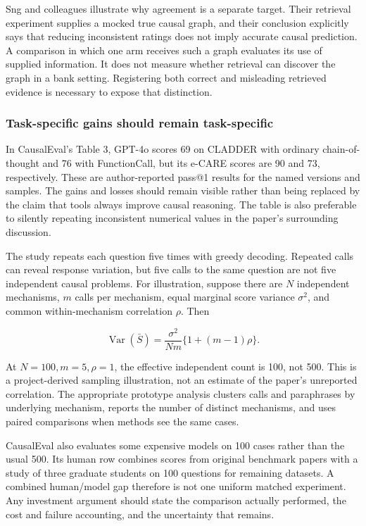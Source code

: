 Sng and colleagues illustrate why agreement is a separate target. Their
retrieval experiment supplies a mocked true causal graph, and their
conclusion explicitly says that reducing inconsistent ratings does not
imply accurate causal prediction. A comparison in which one arm receives
such a graph evaluates its use of supplied information. It does not
measure whether retrieval can discover the graph in a bank setting.
Registering both correct and misleading retrieved evidence is necessary
to expose that distinction. \cite{exec13_hallucination}

\hypertarget{task-specific-gains-should-remain-task-specific}{%
\subsubsection{Task-specific gains should remain
task-specific}\label{task-specific-gains-should-remain-task-specific}}

In CausalEval's Table 3, GPT-4o scores 69 on CLADDER with ordinary
chain-of-thought and 76 with FunctionCall, but its e-CARE scores are 90
and 73, respectively. These are author-reported pass@1 results for the
named versions and samples. The gains and losses should remain visible
rather than being replaced by the claim that tools always improve causal
reasoning. The table is also preferable to silently repeating
inconsistent numerical values in the paper's surrounding discussion.
\cite{exec13_census_causaleval}

The study repeats each question five times with greedy decoding.
Repeated calls can reveal response variation, but five calls to the same
question are not five independent causal problems. For illustration,
suppose there are \(N\) independent mechanisms, \(m\) calls per
mechanism, equal marginal score variance \(\sigma^2\), and common
within-mechanism correlation \(\rho\). Then

\[
 \operatorname{Var}(\bar S)
 =\frac{\sigma^2}{Nm}\{1+(m-1)\rho\}.
\]

At \(N=100,m=5,\rho=1\), the effective independent count is 100, not
500. This is a project-derived sampling illustration, not an estimate of
the paper's unreported correlation. The appropriate prototype analysis
clusters calls and paraphrases by underlying mechanism, reports the
number of distinct mechanisms, and uses paired comparisons when methods
see the same cases.

CausalEval also evaluates some expensive models on 100 cases rather than
the usual 500. Its human row combines scores from original benchmark
papers with a study of three graduate students on 100 questions for
remaining datasets. A combined human/model gap therefore is not one
uniform matched experiment. Any investment argument should state the
comparison actually performed, the cost and failure accounting, and the
uncertainty that remains.

